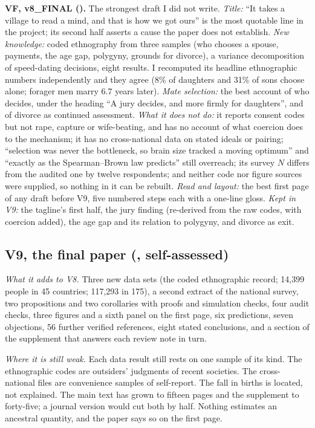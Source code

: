 \documentclass[10pt,letterpaper]{extarticle}
\newcommand{\lab}[1]{\textbf{#1}}
\begin{document}
\lab{VF, v8\_FINAL (\TotVF).} The strongest draft I did not write. \emph{Title:} ``It takes a village to read a mind, and
that is how we got ours'' is the most quotable line in the project; its second half asserts a cause the paper does not
establish. \emph{New knowledge:} coded ethnography from three samples (who chooses a spouse, payments, the age gap,
polygyny, grounds for divorce), a variance decomposition of speed-dating decisions, eight results. I recomputed its
headline ethnographic numbers independently and they agree (8\% of daughters and 31\% of sons choose alone; forager men
marry 6.7 years later). \emph{Mate selection:} the best account of who decides, under the heading ``A jury decides, and
more firmly for daughters'', and of divorce as continued assessment. \emph{What it does not do:} it reports consent codes
but not rape, capture or wife-beating, and has no account of what coercion does to the mechanism; it has no cross-national
data on stated ideals or pairing; ``selection was never the bottleneck, so brain size tracked a moving optimum'' and
``exactly as the Spearman--Brown law predicts'' still overreach; its survey $N$ differs from the audited one by twelve
respondents; and neither code nor figure sources were supplied, so nothing in it can be rebuilt. \emph{Read and layout:} the
best first page of any draft before V9, five numbered steps each with a one-line gloss. \emph{Kept in V9:} the tagline's first
half, the jury finding (re-derived from the raw codes, with coercion added), the age gap and its relation to polygyny, and
divorce as exit.

\subsection*{V9, the final paper (\TotVnine, self-assessed)}
\emph{What it adds to V8.} Three new data sets (the coded ethnographic record; 14{,}399 people in 45 countries; 117{,}293
in 175), a second extract of the national survey, two propositions and two corollaries with proofs and simulation checks,
four audit checks, three figures and a sixth panel on the first page, six predictions, seven objections, 56 further
verified references, eight stated conclusions, and a section of the supplement that answers each review note in turn.

\emph{Where it is still weak.} Each data result still rests on one sample of its kind. The ethnographic codes are outsiders'
judgments of recent societies. The cross-national files are convenience samples of self-report. The fall in births is
located, not explained. The main text has grown to fifteen pages and the supplement to forty-five; a journal version would
cut both by half. Nothing estimates an ancestral quantity, and the paper says so on the first page.
\end{document}
